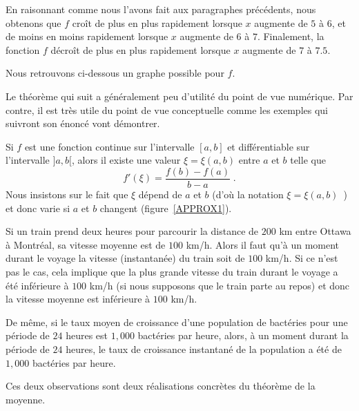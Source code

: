 {\begin{egg}
En raisonnant comme nous l'avons fait aux paragraphes précédents, nous
obtenons que $f$ croît de plus en plus rapidement lorsque $x$ augmente de $5$ à
$6$, et de moins en moins rapidement lorsque $x$ augmente de $6$ à
$7$.  Finalement, la fonction $f$ décroît de plus en plus rapidement
lorsque $x$ augmente de $7$ à $7.5$.

Nous retrouvons ci-dessous un graphe possible pour $f$.
\label{exDER21}
\end{egg}

Le théorème qui suit a généralement peu d'utilité du point de vue
numérique.  Par contre, il est très utile du point de vue conceptuelle
comme les exemples qui suivront son énoncé vont démontrer. 

\begin{focus}{\thm}\label{MVT}
Si $f$ est une fonction continue sur l'intervalle $[a,b]$ et
différentiable sur l'intervalle $]a,b[$, alors il existe une valeur
$\xi = \xi(a,b)$ entre $a$ et $b$ telle que
\[
f'(\xi) = \frac{f(b)-f(a)}{b-a} \; .
\]
Nous insistons sur le fait que $\xi$ dépend de $a$ et $b$ (d'où la
notation $\xi = \xi(a,b)$\ ) et donc varie si $a$ et $b$
changent (figure~\ref{APPROX1}). 
\end{focus}


\begin{egg}
Si un train prend deux heures pour parcourir la distance de $200$ km
entre Ottawa à Montréal, sa vitesse moyenne est de $100$ km/h.  Alors
il faut qu'à un moment durant le voyage la vitesse (instantanée) du
train soit de $100$ km/h.  Si ce n'est pas le cas, cela implique que
la plus grande vitesse du train durant le voyage a été inférieure à
$100$ km/h (si nous supposons que le train parte au repos) et donc la
vitesse moyenne est inférieure à $100$ km/h.

De même, si le taux moyen de croissance d'une population de bactéries
pour une période de $24$ heures est $1,000$ bactéries par heure,
alors, à un moment durant la période de $24$ heures, le taux
de croissance instantané de la population a été de $1,000$ bactéries par
heure.

Ces deux observations sont deux réalisations concrètes du théorème de
la moyenne.
\end{egg}

}
